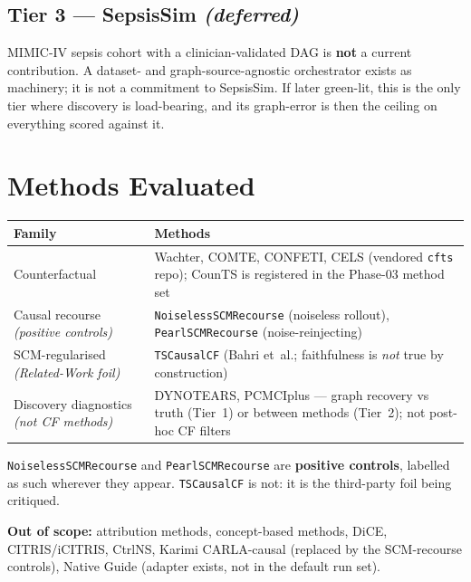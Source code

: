 \documentclass[11pt]{article}
\begin{document}
\subsection{Tier 3 --- SepsisSim \emph{(deferred)}}

MIMIC-IV sepsis cohort with a clinician-validated DAG is \textbf{not} a
current contribution. A dataset- and graph-source-agnostic orchestrator
exists as machinery; it is not a commitment to SepsisSim. If later
green-lit, this is the only tier where discovery is load-bearing, and
its graph-error is then the ceiling on everything scored against it.

\section{Methods Evaluated}

\begin{table}[h!]
  \centering
  \begin{tabularx}{\textwidth}{@{}lX@{}}
    \toprule
    \textbf{Family} & \textbf{Methods} \\
    \midrule
    Counterfactual &
      Wachter, COMTE, CONFETI, CELS (vendored \texttt{cfts} repo);
      CounTS is registered in the Phase-03 method set \\
    Causal recourse
      \emph{(positive controls)} &
      \texttt{NoiselessSCMRecourse} (noiseless rollout),
      \texttt{PearlSCMRecourse} (noise-reinjecting) \\
    SCM-regularised
      \emph{(Related-Work foil)} &
      \texttt{TSCausalCF} (Bahri et~al.; faithfulness is \emph{not}
      true by construction) \\
    Discovery diagnostics
      \emph{(not CF methods)} &
      DYNOTEARS, PCMCIplus --- graph recovery vs truth (Tier~1) or
      between methods (Tier~2); not post-hoc CF filters \\
    \bottomrule
  \end{tabularx}
\end{table}

\texttt{NoiselessSCMRecourse} and \texttt{PearlSCMRecourse} are
\textbf{positive controls}, labelled as such wherever they appear.
\texttt{TSCausalCF} is not: it is the third-party foil being critiqued.

\noindent\textbf{Out of scope:} attribution methods, concept-based
methods, DiCE, CITRIS/iCITRIS, CtrlNS, Karimi CARLA-causal (replaced by
the SCM-recourse controls), Native Guide (adapter exists, not in the
default run set).
\end{document}
